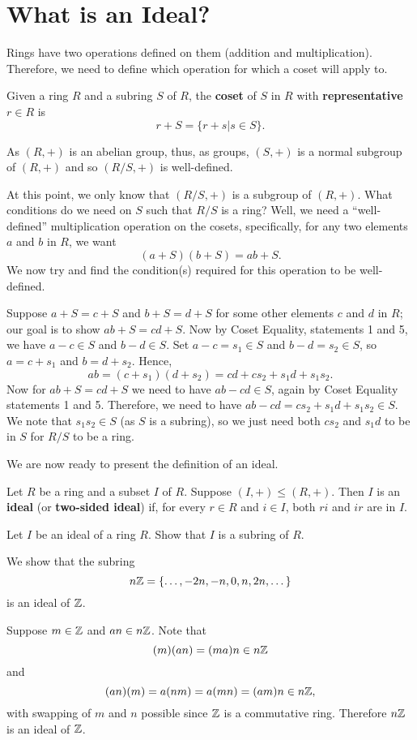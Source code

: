 \newpage

\section{What is an Ideal?}
Rings have two operations defined on them (addition and multiplication). Therefore, we need to define which operation for which a coset will apply to.
\begin{definition}
    Given a ring $R$ and a subring $S$ of $R$, the \textbf{coset} of $S$ in $R$ with \textbf{representative} $r \in R$ is
    \[
        r + S = \{r+s \vert s \in S\}.
    \]
\end{definition}
\begin{remark}
    As $(R,+)$ is an abelian group, thus, as groups, $(S,+)$ is a normal subgroup of $(R,+)$ and so $(R/S,+)$ is well-defined.
\end{remark}

At this point, we only know that $(R/S,+)$ is a subgroup of $(R,+)$. What conditions do we need on $S$ such that $R/S$ is a ring? Well, we need a ``well-defined'' multiplication operation on the cosets, specifically, for any two elements $a$ and $b$ in $R$, we want
\[
    (a+S)(b+S) = ab + S.
\]
We now try and find the condition(s) required for this operation to be well-defined.

Suppose $a+S = c+S$ and $b+S = d+S$ for some other elements $c$ and $d$ in $R$; our goal is to show $ab+S = cd+S$. Now by Coset Equality, statements 1 and 5, we have $a-c \in S$ and $b-d \in S$. Set $a-c = s_1 \in S$ and $b-d = s_2 \in S$, so $a = c+s_1$ and $b = d+s_2$. Hence,
\[
    ab = (c+s_1)(d+s_2) = cd + cs_2 + s_1d + s_1s_2.
\]
Now for $ab + S = cd+S$ we need to have $ab-cd \in S$, again by Coset Equality statements 1 and 5. Therefore, we need to have $ab-cd = cs_2+s_1d+s_1s_2 \in S$. We note that $s_1s_2 \in S$ (as $S$ is a subring), so we just need both $cs_2$ and $s_1d$ to be in $S$ for $R/S$ to be a ring.

We are now ready to present the definition of an ideal.
\begin{definition}
    Let $R$ be a ring and a subset $I$ of $R$. Suppose $(I,+) \leq (R,+)$. Then $I$ is an \textbf{ideal} (or \textbf{two-sided ideal}) if, for every $r \in R$ and $i \in I$, both $ri$ and $ir$ are in $I$.
\end{definition}
\begin{exercise}\label{exercise-ideal-is-a-subring}
    Let $I$ be an ideal of a ring $R$. Show that $I$ is a subring of $R$.
\end{exercise}
\begin{example}\label{example-nZ-ideal-of-Z}
    We show that the subring
    \[
        n\mathbb{Z} = \{\dots, -2n, -n, 0, n, 2n, \dots\}
    \]
    is an ideal of $\mathbb{Z}$.

    Suppose $m \in \mathbb{Z}$ and $an \in n\mathbb{Z}$.  Note that
    \[
        (m)(an) = (ma)n \in n\mathbb{Z}
    \]
    and
    \[
        (an)(m) = a(nm) = a(mn) = (am)n \in n\mathbb{Z},
    \]
    with swapping of $m$ and $n$ possible since $\mathbb{Z}$ is a commutative ring. Therefore $n\mathbb{Z}$ is an ideal of $\mathbb{Z}$.
\end{example}

